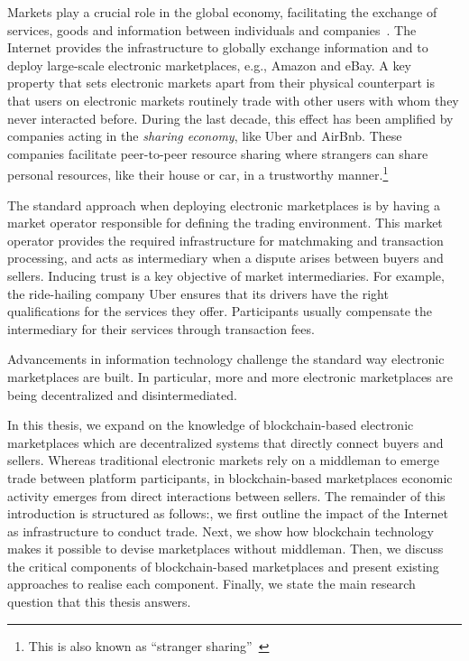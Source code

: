 Markets play a crucial role in the global economy, facilitating the exchange of services, goods and information between individuals and companies~\cite{bakos1998emerging}.
The Internet provides the infrastructure to globally exchange information and to deploy large-scale electronic marketplaces, e.g., Amazon and eBay.
A key property that sets electronic markets apart from their physical counterpart is that users on electronic markets routinely trade with other users with whom they never interacted before.
During the last decade, this effect has been amplified by companies acting in the \emph{sharing economy}, like Uber and AirBnb.
These companies facilitate peer-to-peer resource sharing where strangers can share personal resources, like their house or car, in a trustworthy manner.\footnote{This is also known as \enquote{stranger sharing}~\cite{schor2016debating}}


The standard approach when deploying electronic marketplaces is by having a market operator responsible for defining the trading environment.
This market operator provides the required infrastructure for matchmaking and transaction processing, and acts as intermediary when a dispute arises between buyers and sellers.
Inducing trust is a key objective of market intermediaries.
For example, the ride-hailing company Uber ensures that its drivers have the right qualifications for the services they offer.
Participants usually compensate the intermediary for their services through transaction fees.

Advancements in information technology challenge the standard way electronic marketplaces are built.
In particular, more and more electronic marketplaces are being decentralized and disintermediated. 

In this thesis, we expand on the knowledge of blockchain-based electronic marketplaces which are decentralized systems that directly connect buyers and sellers.
Whereas traditional electronic markets rely on a middleman to emerge trade between platform participants, in blockchain-based marketplaces economic activity emerges from direct interactions between sellers.
The remainder of this introduction is structured as follows:, we first outline the impact of the Internet as infrastructure to conduct trade.
Next, we show how blockchain technology makes it possible to devise marketplaces without middleman.
Then, we discuss the critical components of blockchain-based marketplaces and present existing approaches to realise each component.
Finally, we state the main research question that this thesis answers.

